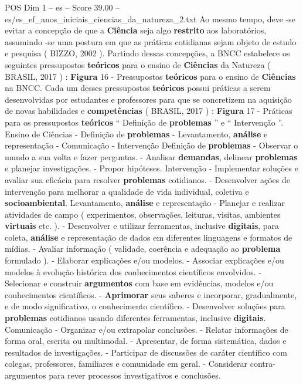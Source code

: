 \begin{textsample}{POS Dim 1 – es – Score 39.00 – es/es\_ef\_anos\_iniciais\_ciencias\_da\_natureza\_2.txt}
Ao mesmo tempo, deve -se evitar a concepção de que a \textbf{Ciência} seja algo \textbf{restrito} aos laboratórios, assumindo -se uma postura em que as práticas cotidianas sejam objeto de estudo e pesquisa ( BIZZO, 2002 ).
Partindo dessas concepções, a BNCC estabelece os seguintes pressupostos \textbf{teóricos} para o ensino de \textbf{Ciências} da Natureza ( BRASIL, 2017 ) : \textbf{Figura} 16 - Pressupostos \textbf{teóricos} para o ensino de \textbf{Ciências} na BNCC.
Cada um desses pressupostos \textbf{teóricos} possui práticas a serem desenvolvidas por estudantes e professores para que se concretizem na aquisição de novas habilidades e \textbf{competências} ( BRASIL, 2017 ) : \textbf{Figura} 17 - Práticas para os pressupostos \textbf{teóricos} “ Definição de \textbf{problemas} ” e “ Intervenção ”.
Ensino de Ciências - Definição de \textbf{problemas} - Levantamento, \textbf{análise} e representação - Comunicação - Intervenção Definição de \textbf{problemas} - Observar o mundo a sua volta e fazer perguntas. - Analisar \textbf{demandas}, delinear \textbf{problemas} e planejar investigações. - Propor hipóteses.
Intervenção - Implementar soluções e avaliar sua eficácia para resolver \textbf{problemas} cotidianos. - Desenvolver ações de intervenção para melhorar a qualidade de vida individual, coletiva e \textbf{socioambiental}.
Levantamento, \textbf{análise} e representação - Planejar e realizar atividades de campo ( experimentos, observações, leituras, visitas, ambientes \textbf{virtuais} etc. ). - Desenvolver e utilizar ferramentas, inclusive \textbf{digitais}, para coleta, \textbf{análise} e representação de dados em diferentes linguagens e formatos de mídias. - Avaliar informação ( validade, coerência e adequação ao \textbf{problema} formulado ). - Elaborar explicações e/ou modelos. - Associar explicações e/ou modelos à evolução histórica dos conhecimentos científicos envolvidos. - Selecionar e construir \textbf{argumentos} com base em evidências, modelos e/ou conhecimentos científicos. - \textbf{Aprimorar} seus saberes e incorporar, gradualmente, e de modo significativo, o conhecimento científico. - Desenvolver soluções para \textbf{problemas} cotidianos usando diferentes ferramentas, inclusive \textbf{digitais}.
Comunicação - Organizar e/ou extrapolar conclusões. - Relatar informações de forma oral, escrita ou multimodal. - Apresentar, de forma sistemática, dados e resultados de investigações. - Participar de discussões de caráter científico com colegas, professores, familiares e comunidade em geral. - Considerar contra-argumentos para rever processos investigativos e conclusões.

\end{textsample}
